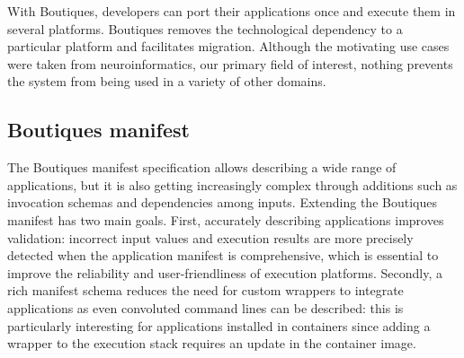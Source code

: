 \documentclass{article}
\newcommand{\boutiques}{Boutiques\xspace}
\begin{document}
With Boutiques, developers can port their applications once and execute
them in several platforms. \boutiques removes the technological dependency to a
particular platform and facilitates migration.  Although the
motivating use cases were taken from neuroinformatics, our primary
field of interest, nothing prevents the system from being used in a
variety of other domains.


\subsection{\boutiques manifest}

The \boutiques manifest specification allows describing a wide range
of applications, but it is also getting increasingly complex through
additions such as invocation schemas and dependencies among
inputs. Extending the \boutiques manifest has two main goals. First,
accurately describing applications improves validation: incorrect input
values and execution results are more precisely detected when the
application manifest is comprehensive, which is essential to improve
the reliability and user-friendliness of execution
platforms. Secondly, a rich manifest schema reduces the need for
custom wrappers to integrate applications as even convoluted command
lines can be described: this is particularly interesting for
applications installed in containers since adding a wrapper to the
execution stack requires an update in the container image.
\end{document}
